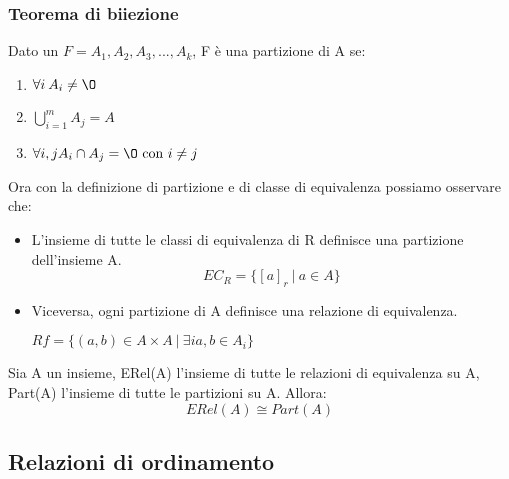 \subsubsection{Teorema di biiezione}
\begin{definition}[Partizione]
    Dato un $F = A_1, A_2, A_3, ..., A_k$, F è una partizione di A se:
\end{definition}
\begin{enumerate}
    \item $\forall i \: A_i \neq \O$
    \item $\bigcup^m_{i=1}A_j = A$
    \item $\forall i, j A_i \cap A_j = \O\text{ con } i \neq j$
\end{enumerate}
Ora con la definizione di partizione e di classe di equivalenza possiamo osservare che:
\begin{itemize}
    \item L'insieme di tutte le classi di equivalenza di R definisce una partizione dell'insieme A.
    \[EC_R = \{[a]_r \:|\: a \in A\}\]
    \item Viceversa, ogni partizione di A definisce una relazione di equivalenza.
    \begin{center}
        $Rf = \{(a,b) \in A \times A \: | \: \exists i a,b \in A_i\}$
    \end{center}
\end{itemize}

\begin{theorem}
    Sia A un insieme, ERel(A) l'insieme di tutte le relazioni di equivalenza su A, Part(A) l'insieme di tutte le partizioni su A. Allora:
    \begin{equation}
        ERel(A) \cong Part(A)
    \end{equation}
\end{theorem}

\subsection{Relazioni di ordinamento}
